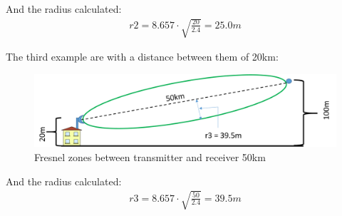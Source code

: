 And the radius calculated:
\begin{align*}
r2 = 8.657\cdot \sqrt{\frac{20}{2.4}} = 25.0m
\end{align*}

The third example are with a distance between them of 20km:

\begin{figure}[H]
	\centering
	\includegraphics[scale=0.50]{figures/fresnel_50km.png}
	\caption{Fresnel zones between transmitter and receiver 50km}
	\label{fig:fresnel_zones_50km}
\end{figure}  

And the radius calculated:
\begin{align*}
r3 = 8.657\cdot \sqrt{\frac{50}{2.4}} = 39.5m
\end{align*}

